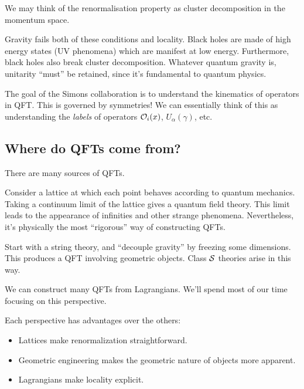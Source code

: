 We may think of the renormalisation property as cluster decomposition in the momentum space.

Gravity fails both of these conditions and locality.
Black holes are made of high energy states (UV phenomena) which are manifest at low energy. Furthermore, black holes also break cluster decomposition.
Whatever quantum gravity is, unitarity ``must'' be retained, since it's fundamental to quantum physics.

The goal of the Simons collaboration is to understand the kinematics of operators in QFT.
This is governed by symmetries!
We can essentially think of this as understanding the \emph{labels} of operators $\mathcal{O}_i(x)$, $U_\alpha(\gamma)$, etc.

\subsection{Where do QFTs come from?}

There are many sources of QFTs.

\begin{ex}[Lattices]
	Consider a lattice at which each point behaves according to quantum mechanics.
	Taking a continuum limit of the lattice gives a quantum field theory.
	This limit leads to the appearance of infinities and other strange phenomena.
	Nevertheless, it's physically the most ``rigorous'' way of constructing QFTs.
\end{ex}

\begin{ex}
	Start with a string theory, and ``decouple gravity'' by freezing some dimensions.
	This produces a QFT involving geometric objects.
	Class $\mathcal{S}$ theories arise in this way.
\end{ex}

\begin{ex}[Lagrangians]
	We can construct many QFTs from Lagrangians.
	We'll spend most of our time focusing on this perspective.
\end{ex}

Each perspective has advantages over the others:
\begin{itemize}
	\item Lattices make renormalization straightforward.
	\item Geometric engineering makes the geometric nature of objects more apparent.
	\item Lagrangians make locality explicit.
\end{itemize}
	

